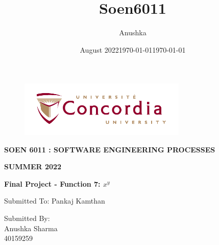 \documentclass{article}
\title{Soen6011}
\author{Anushka }
\date{August 2022}
\title
\begin{document}
\begin{titlepage}
\vspace*{0.7in}
\begin{center}
\begin{figure}[htb]
\begin{center}
\includegraphics[width=8cm]{univ_logo}
\end{center}
\end{figure}
\vspace*{0.3in}
\begin{Large}
\textbf{SOEN 6011 : SOFTWARE ENGINEERING PROCESSES} \\
\end{Large}
\vspace*{0.1in}
\begin{Large}
\textbf{SUMMER 2022} \\
\end{Large}
\vspace*{0.9in}
\begin{Large}
\begin{center}
   \textbf{ Final Project - Function 7: \(x^y\)} \\ 
\end{center} 
\end{Large}
\vspace*{0.9in}
\begin{large}
Submitted To: Pankaj Kamthan \\
\vspace*{0.1in}

\date{\normalsize\today} 
\end{large}
\vspace*{0.1in}
\begin{large}
Submitted By: \\
\vspace*{0.1in}
Anushka Sharma\\
\vspace*{0.1in}
40159259\\
\vspace*{0.3in}
\date{\normalsize\today} 
\end{large}
\end{center}

\end{titlepage}
\tableofcontents
\newpage
{}
\end{document}
